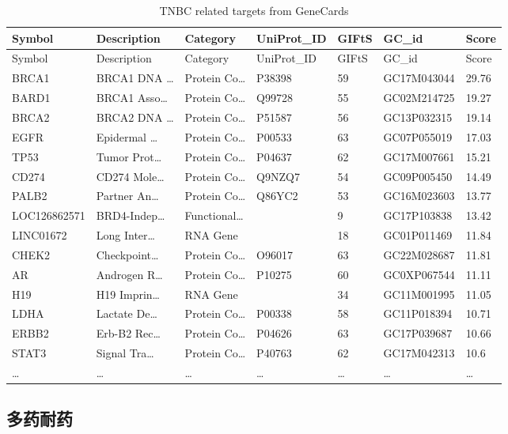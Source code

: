 \documentclass[
]{article}
\begin{document}
\begin{longtable}[]{@{}lllllll@{}}
\caption{\label{tab:TNBC-related-targets-from-GeneCards}TNBC related targets from GeneCards}\tabularnewline
\toprule
Symbol & Description & Category & UniProt\_ID & GIFtS & GC\_id & Score\tabularnewline
\midrule
\endfirsthead
\toprule
Symbol & Description & Category & UniProt\_ID & GIFtS & GC\_id & Score\tabularnewline
\midrule
\endhead
BRCA1 & BRCA1 DNA \ldots{} & Protein Co\ldots{} & P38398 & 59 & GC17M043044 & 29.76\tabularnewline
BARD1 & BRCA1 Asso\ldots{} & Protein Co\ldots{} & Q99728 & 55 & GC02M214725 & 19.27\tabularnewline
BRCA2 & BRCA2 DNA \ldots{} & Protein Co\ldots{} & P51587 & 56 & GC13P032315 & 19.14\tabularnewline
EGFR & Epidermal \ldots{} & Protein Co\ldots{} & P00533 & 63 & GC07P055019 & 17.03\tabularnewline
TP53 & Tumor Prot\ldots{} & Protein Co\ldots{} & P04637 & 62 & GC17M007661 & 15.21\tabularnewline
CD274 & CD274 Mole\ldots{} & Protein Co\ldots{} & Q9NZQ7 & 54 & GC09P005450 & 14.49\tabularnewline
PALB2 & Partner An\ldots{} & Protein Co\ldots{} & Q86YC2 & 53 & GC16M023603 & 13.77\tabularnewline
LOC126862571 & BRD4-Indep\ldots{} & Functional\ldots{} & & 9 & GC17P103838 & 13.42\tabularnewline
LINC01672 & Long Inter\ldots{} & RNA Gene & & 18 & GC01P011469 & 11.84\tabularnewline
CHEK2 & Checkpoint\ldots{} & Protein Co\ldots{} & O96017 & 63 & GC22M028687 & 11.81\tabularnewline
AR & Androgen R\ldots{} & Protein Co\ldots{} & P10275 & 60 & GC0XP067544 & 11.11\tabularnewline
H19 & H19 Imprin\ldots{} & RNA Gene & & 34 & GC11M001995 & 11.05\tabularnewline
LDHA & Lactate De\ldots{} & Protein Co\ldots{} & P00338 & 58 & GC11P018394 & 10.71\tabularnewline
ERBB2 & Erb-B2 Rec\ldots{} & Protein Co\ldots{} & P04626 & 63 & GC17P039687 & 10.66\tabularnewline
STAT3 & Signal Tra\ldots{} & Protein Co\ldots{} & P40763 & 62 & GC17M042313 & 10.6\tabularnewline
\ldots{} & \ldots{} & \ldots{} & \ldots{} & \ldots{} & \ldots{} & \ldots{}\tabularnewline
\bottomrule
\end{longtable}

\hypertarget{ux591aux836fux8010ux836f}{%
\subsection{多药耐药}\label{ux591aux836fux8010ux836f}}
\end{document}
